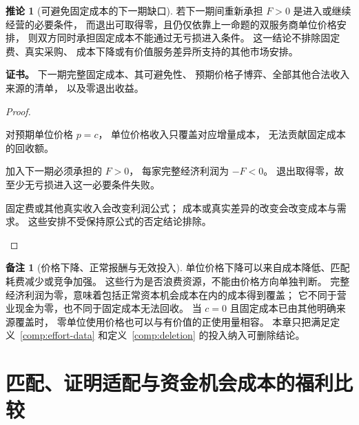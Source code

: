 \documentclass[UTF8,12pt,a4paper,openany,fontset=none,zihao=false]{ctexrep}
\theoremstyle{definition}
\newtheorem{corollary}{推论}[chapter]
\newtheorem{remark}{备注}[chapter]
\newenvironment{certificate}{\par\noindent\textbf{证书。}\ignorespaces}{\par}
\newcommand{\1}{\mathbf 1}
\begin{document}
\begin{corollary}[可避免固定成本的下一期缺口]
\label{comp:next-period-gap}
若下一期间重新承担 \(F>0\) 是进入或继续经营的必要条件，
而退出可取得零，且仍仅依靠上一命题的双服务商单位价格安排，
则双方同时承担固定成本不能通过无亏损进入条件。
这一结论不排除固定费、真实采购、
成本下降或有价值服务差异所支持的其他市场安排。
\end{corollary}
\begin{certificate}
下一期完整固定成本、其可避免性、
预期价格子博弈、全部其他合法收入来源的清单，
以及零退出收益。
\end{certificate}
\begin{proof}
\begin{semanticsteps}
\item 对预期单位价格 \(p=c\)，
单位价格收入只覆盖对应增量成本，
无法贡献固定成本的回收额。
\item 加入下一期必须承担的 \(F>0\)，
每家完整经济利润为 \(-F<0\)。
退出取得零，故至少无亏损进入这一必要条件失败。
\item 固定费或其他真实收入会改变利润公式；
成本或真实差异的改变会改变成本与需求。
这些安排不受保持原公式的否定结论排除。
\end{semanticsteps}
\end{proof}

\begin{remark}[价格下降、正常报酬与无效投入]
单位价格下降可以来自成本降低、匹配耗费减少或竞争加强。
这些行为是否浪费资源，不能由价格方向单独判断。
完整经济利润为零，意味着包括正常资本机会成本在内的成本得到覆盖；
它不同于营业现金为零，也不同于固定成本无法回收。
当 \(c=0\) 且固定成本已由其他明确来源覆盖时，
零单位使用价格也可以与有价值的正使用量相容。
本章只把满足定义~\ref{comp:effort-data}
和定义~\ref{comp:deletion} 的投入纳入可删除结论。
\end{remark}

\section{匹配、证明适配与资金机会成本的福利比较}
\end{document}
